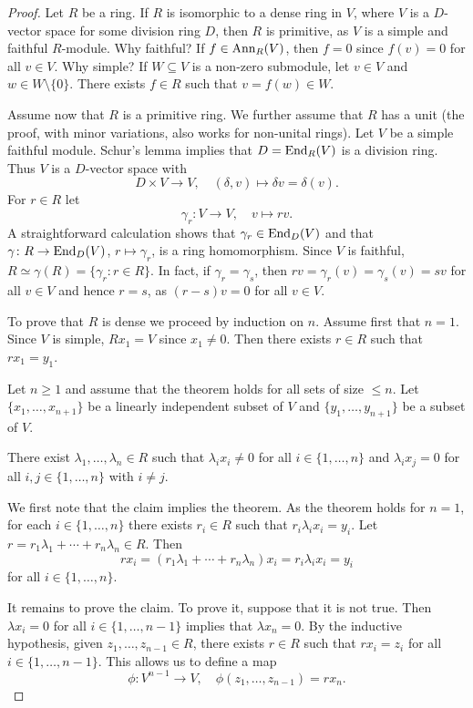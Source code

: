 \begin{proof}
    Let $R$ be a ring. 
    If $R$ is isomorphic to a dense ring in $V$, where
	$V$ is a $D$-vector space for some division ring $D$, then $R$
	is primitive, as $V$ is a simple and faithful $R$-module. Why faithful? If 
	$f\in\operatorname{Ann}_R(V)$, then $f=0$ since $f(v)=0$ for all $v\in V$. Why simple? 
	If $W\subseteq V$ is a non-zero submodule, let $v\in V$ and $w\in
	W\setminus\{0\}$. There exists $f\in R$ such that $v=f(w)\in W$. 

   Assume now that $R$ is a primitive ring. We further assume that $R$ 
   has a unit (the proof, with minor variations, also works for non-unital rings). 
   Let $V$ be a simple faithful module.
	Schur's lemma implies that $D=\operatorname{End}_R(V)$ is a division ring. Thus $V$ is
	a $D$-vector space with 
	\[
	D\times V\to V,\quad
	(\delta,v)\mapsto \delta v=\delta(v).
	\]
	For $r\in R$ let  
	\[
		\gamma_r\colon V\to V,\quad
		v\mapsto rv.
	\]
	A straightforward calculation shows that $\gamma_r\in\operatorname{End}_D(V)$ and that
    $\gamma\colon R\to\operatorname{End}_D(V)$,
	$r\mapsto\gamma_r$, is a ring homomorphism. Since $V$ is faithful,
	$R\simeq\gamma(R)=\{\gamma_r:r\in R\}$. In fact, if $\gamma_r=\gamma_s$, then 
	$rv=\gamma_r(v)=\gamma_s(v)=sv$ for all $v\in V$ and hence $r=s$, as
	$(r-s)v=0$ for all $v\in V$.

    To prove that $R$ is dense we proceed by induction on $n$. Assume first that
    $n=1$. Since $V$ is simple, $Rx_1=V$ since $x_1\ne 0$. Then there
    exists $r\in R$ such that $rx_1=y_1$. 

    Let $n\geq1$ and assume that the theorem holds for all sets of size $\leq n$. Let $\{x_1,\dots,x_{n+1}\}$ be a linearly independent subset of $V$ and 
    $\{y_1,\dots,y_{n+1}\}$ be a subset of $V$. 

    \begin{claim}
        There exist $\lambda_1,\dots,\lambda_n\in R$ such 
        that $\lambda_ix_i\ne 0$ for all $i\in\{1,\dots,n\}$ and 
        $\lambda_ix_j=0$ for all $i,j\in\{1,\dots,n\}$ with $i\ne j$. 
    \end{claim}

    We first note that the claim implies the theorem. As the theorem holds for $n=1$, 
    for each $i\in\{1,\dots,n\}$ 
    there exists $r_i\in R$ such that $r_i\lambda_ix_i=y_i$. Let 
    $r=r_1\lambda_1+\cdots+r_n\lambda_n\in R$. Then
    \[
    rx_i=(r_1\lambda_1+\cdots+r_n\lambda_n)x_i=r_i\lambda_ix_i=y_i
    \]
    for all $i\in\{1,\dots,n\}$. 

    It remains to prove the claim. To prove it, suppose that it is not true. Then
    $\lambda x_i=0$ for all $i\in\{1,\dots,n-1\}$ implies that 
    $\lambda x_n=0$. By the inductive hypothesis, given $z_1,\dots,z_{n-1}\in R$, 
    there exists $r\in R$ such that
    $rx_i=z_i$ for all $i\in\{1,\dots,n-1\}$. This allows us to define a map  
    \[
    \phi\colon V^{n-1}\to V,\quad \phi(z_1,\dots,z_{n-1})=rx_n.
    \]
    

\end{proof}
